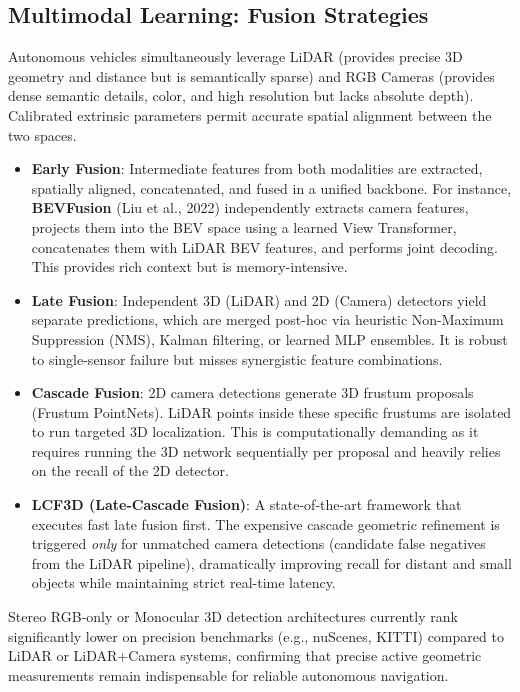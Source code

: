 \subsection{Multimodal Learning: Fusion Strategies}
Autonomous vehicles simultaneously leverage LiDAR (provides precise 3D geometry and distance but is semantically sparse) and RGB Cameras (provides dense semantic details, color, and high resolution but lacks absolute depth). Calibrated extrinsic parameters permit accurate spatial alignment between the two spaces.
\begin{itemize}
    \item \textbf{Early Fusion}: Intermediate features from both modalities are extracted, spatially aligned, concatenated, and fused in a unified backbone. For instance, \textbf{BEVFusion} (Liu et al., 2022) independently extracts camera features, projects them into the BEV space using a learned View Transformer, concatenates them with LiDAR BEV features, and performs joint decoding. This provides rich context but is memory-intensive.
    \item \textbf{Late Fusion}: Independent 3D (LiDAR) and 2D (Camera) detectors yield separate predictions, which are merged post-hoc via heuristic Non-Maximum Suppression (NMS), Kalman filtering, or learned MLP ensembles. It is robust to single-sensor failure but misses synergistic feature combinations.
    \item \textbf{Cascade Fusion}: 2D camera detections generate 3D frustum proposals (Frustum PointNets). LiDAR points inside these specific frustums are isolated to run targeted 3D localization. This is computationally demanding as it requires running the 3D network sequentially per proposal and heavily relies on the recall of the 2D detector.
    \item \textbf{LCF3D (Late-Cascade Fusion)}: A state-of-the-art framework that executes fast late fusion first. The expensive cascade geometric refinement is triggered \textit{only} for unmatched camera detections (candidate false negatives from the LiDAR pipeline), dramatically improving recall for distant and small objects while maintaining strict real-time latency.
\end{itemize}
Stereo RGB-only or Monocular 3D detection architectures currently rank significantly lower on precision benchmarks (e.g., nuScenes, KITTI) compared to LiDAR or LiDAR+Camera systems, confirming that precise active geometric measurements remain indispensable for reliable autonomous navigation.

